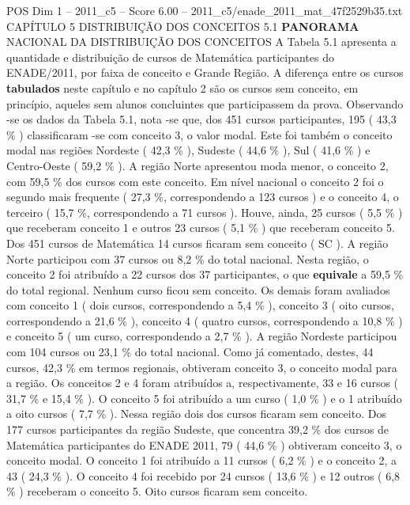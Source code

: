 \begin{textsample}{POS Dim 1 – 2011\_c5 – Score 6.00 – 2011\_c5/enade\_2011\_mat\_47f2529b35.txt}  \label{ex:f1_pos_121}
CAPÍTULO 5 DISTRIBUIÇÃO DOS CONCEITOS 5.1 \textbf{PANORAMA} NACIONAL DA DISTRIBUIÇÃO DOS CONCEITOS A Tabela 5.1 apresenta a quantidade e distribuição de cursos de Matemática participantes do ENADE/2011, por faixa de conceito e Grande Região.
A diferença entre os cursos \textbf{tabulados} neste capítulo e no capítulo 2 são os cursos sem conceito, em princípio, aqueles sem alunos concluintes que participassem da prova.
Observando -se os dados da Tabela 5.1, nota -se que, dos 451 cursos participantes, 195 ( 43,3 \% ) classificaram -se com conceito 3, o valor modal.
Este foi também o conceito modal nas regiões Nordeste ( 42,3 \% ), Sudeste ( 44,6 \% ), Sul ( 41,6 \% ) e Centro-Oeste ( 59,2 \% ).
A região Norte apresentou moda menor, o conceito 2, com 59,5 \% dos cursos com este conceito.
Em nível nacional o conceito 2 foi o segundo mais frequente ( 27,3 \%, correspondendo a 123 cursos ) e o conceito 4, o terceiro ( 15,7 \%, correspondendo a 71 cursos ).
Houve, ainda, 25 cursos ( 5,5 \% ) que receberam conceito 1 e outros 23 cursos ( 5,1 \% ) que receberam conceito 5.
Dos 451 cursos de Matemática 14 cursos ficaram sem conceito ( SC ).
A região Norte participou com 37 cursos ou 8,2 \% do total nacional.
Nesta região, o conceito 2 foi atribuído a 22 cursos dos 37 participantes, o que \textbf{equivale} a 59,5 \% do total regional.
Nenhum curso ficou sem conceito.
Os demais foram avaliados com conceito 1 ( dois cursos, correspondendo a 5,4 \% ), conceito 3 ( oito cursos, correspondendo a 21,6 \% ), conceito 4 ( quatro cursos, correspondendo a 10,8 \% ) e conceito 5 ( um curso, correspondendo a 2,7 \% ).
A região Nordeste participou com 104 cursos ou 23,1 \% do total nacional.
Como já comentado, destes, 44 cursos, 42,3 \% em termos regionais, obtiveram conceito 3, o conceito modal para a região.
Os conceitos 2 e 4 foram atribuídos a, respectivamente, 33 e 16 cursos ( 31,7 \% e 15,4 \% ).
O conceito 5 foi atribuído a um curso ( 1,0 \% ) e o 1 atribuído a oito cursos ( 7,7 \% ).
Nessa região dois dos cursos ficaram sem conceito.
Dos 177 cursos participantes da região Sudeste, que concentra 39,2 \% dos cursos de Matemática participantes do ENADE 2011, 79 ( 44,6 \% ) obtiveram conceito 3, o conceito modal.
O conceito 1 foi atribuído a 11 cursos ( 6,2 \% ) e o conceito 2, a 43 ( 24,3 \% ).
O conceito 4 foi recebido por 24 cursos ( 13,6 \% ) e 12 outros ( 6,8 \% ) receberam o conceito 5.
Oito cursos ficaram sem conceito.

\end{textsample}

